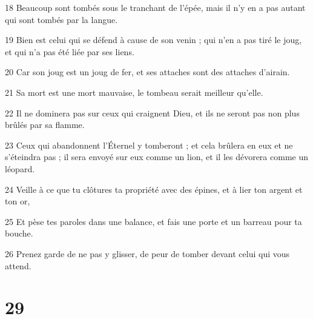 \par 18 Beaucoup sont tombés sous le tranchant de l'épée, mais il n'y en a pas autant qui sont tombés par la langue.
\par 19 Bien est celui qui se défend à cause de son venin ; qui n'en a pas tiré le joug, et qui n'a pas été liée par ses liens.
\par 20 Car son joug est un joug de fer, et ses attaches sont des attaches d'airain.
\par 21 Sa mort est une mort mauvaise, le tombeau serait meilleur qu'elle.
\par 22 Il ne dominera pas sur ceux qui craignent Dieu, et ils ne seront pas non plus brûlés par sa flamme.
\par 23 Ceux qui abandonnent l'Éternel y tomberont ; et cela brûlera en eux et ne s'éteindra pas ; il sera envoyé sur eux comme un lion, et il les dévorera comme un léopard.
\par 24 Veille à ce que tu clôtures ta propriété avec des épines, et à lier ton argent et ton or,
\par 25 Et pèse tes paroles dans une balance, et fais une porte et un barreau pour ta bouche.
\par 26 Prenez garde de ne pas y glisser, de peur de tomber devant celui qui vous attend.

\chapter{29}

